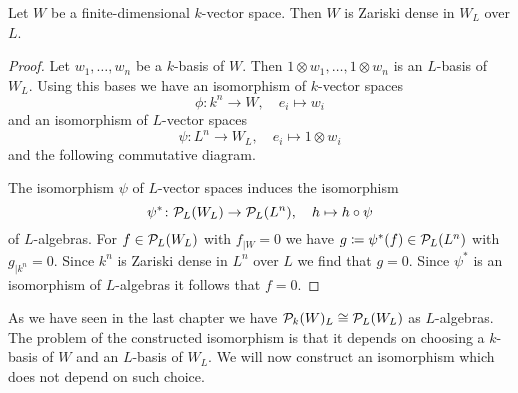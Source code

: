 \begin{lem}\label{lem: W Zariski dense in W_L}
  Let $W$ be a finite-dimensional $k$-vector space.
  Then $W$ is Zariski dense in $W_L$ over $L$.
\end{lem}
\begin{proof}
  Let $w_1, \dotsc, w_n$ be a $k$-basis of $W$.
  Then $1 \otimes w_1, \dotsc, 1 \otimes w_n$ is an $L$-basis of $W_L$.
  Using this bases we have an isomorphism of $k$-vector spaces
  \[
            \phi
    \colon  k^n \to W,
    \quad   e_i
    \mapsto w_i
  \]
  and an isomorphism of $L$-vector spaces
  \[
            \psi
    \colon  L^n
    \to     W_L,
    \quad   e_i
    \mapsto 1 \otimes w_i
  \]
  and the following commutative diagram.
  \begin{center}
  \end{center}
  The isomorphism $\psi$ of $L$-vector spaces induces the isomorphism
  \[
            \psi^*
    \colon  \mathcal{P}_L(W_L)
    \to     \mathcal{P}_L(L^n),
    \quad   h
    \mapsto h \circ \psi
  \]
  of $L$-algebras.
  For $f \in \mathcal{P}_L(W_L)$ with $f_{|W} = 0$ we have $g \coloneqq \psi^*(f) \in \mathcal{P}_L(L^n)$ with $g_{|k^n} = 0$.
  Since $k^n$ is Zariski dense in $L^n$ over $L$ we find that $g = 0$.
  Since $\psi^*$ is an isomorphism of $L$-algebras it follows that $f = 0$.
\end{proof}


As we have seen in the last chapter we have $\mathcal{P}_k(W)_L \cong \mathcal{P}_L(W_L)$ as $L$-algebras.
The problem of the constructed isomorphism is that it depends on choosing a $k$-basis of $W$ and an $L$-basis of $W_L$.
We will now construct an isomorphism which does not depend on such choice.


